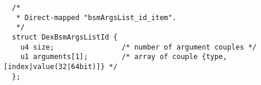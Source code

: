 {\tiny \begin{verbatim}
  /*
   * Direct-mapped "bsmArgsList_id_item".
   */
  struct DexBsmArgsListId {
    u4 size;                /* number of argument couples */
    u1 arguments[1];        /* array of couple {type,[index|value(32|64bit)]} */
  };
\end{verbatim} }